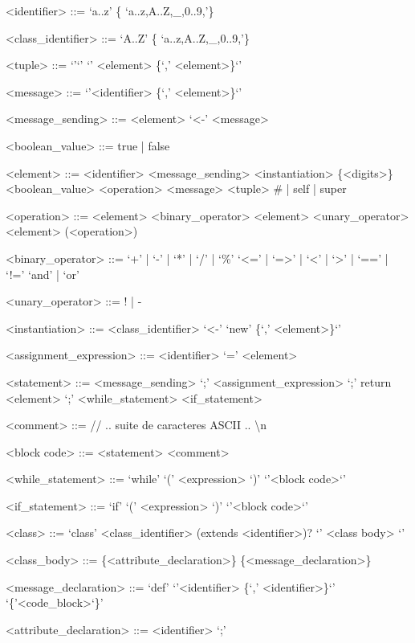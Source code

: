 \documentclass{eplDoc}
\begin{document}
\begin{grammar}
<identifier> ::= `a..z' \{ `a..z,A..Z,\_,0..9,'\} 

<class\_identifier> ::= `A..Z' \{ `a..z,A..Z,\_,0..9,'\} 

<tuple> ::= `{'`}' \alt `{' <element> \{`,' <element>\}`}'

<message> ::= `{'<identifier> \{`,' <element>\}`}'

<message\_sending> ::= <element> `<-' <message>

<boolean\_value> ::= true | false

<element> ::= <identifier> 
\alt<message\_sending>
\alt<instantiation>
\alt \{<digits>\}
\alt <boolean\_value>
\alt <operation>
\alt <message>
\alt <tuple>
\alt \# | self | super

<operation> ::= <element> <binary\_operator> <element>
\alt <unary\_operator> <element>
\alt (<operation>)

<binary\_operator> ::= `+' | `-' | `*' | `/' | `\%' 
\alt `<=' | `=>' | `<' | `>' | `==' | `!=' 
\alt `and' | `or'

<unary\_operator> ::= ! | - 

<instantiation> ::= <class\_identifier> `<-' `{new' \{`,' <element>\}`}'


<assignment\_expression> ::= <identifier> `=' <element>

<statement> ::= <message\_sending> `;'
\alt <assignment\_expression> `;'
\alt return <element> `;'
\alt <while\_statement>
\alt <if\_statement>

<comment> ::= // .. suite de caracteres ASCII .. \textbackslash n

<block code> ::= { <statement> } { <comment> } 

<while\_statement> ::= `while' `(' <expression> `)'  `{'<block code>`}'

<if\_statement> ::= `if' `(' <expression> `)'  `{'<block code>`}'




<class> ::= `class' <class\_identifier> (extends <identifier>)? `{' <class body> `}'

<class\_body> ::= \{<attribute\_declaration>\} \{<message\_declaration>\}

<message\_declaration> ::= `def'  `{'<identifier> \{`,' <identifier>\}`}' `\{'<code\_block>`\}'

<attribute\_declaration> ::= <identifier> `;'

\end{grammar}
\end{document}
